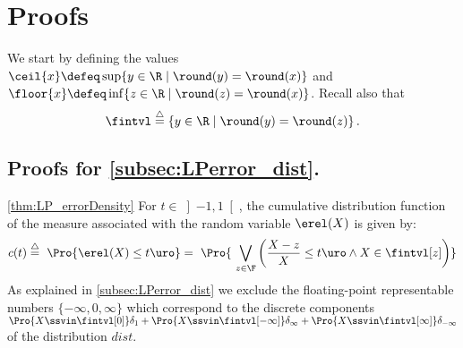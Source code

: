 
\appendix

\section{Proofs}
We start by defining the values $\ceil{x}\defeq \sup\{y\in\R\mid \round(y)=\round(x)\}$ and $\floor{x}\defeq \inf\{z\in\R\mid \round(z)=\round(x)\}$. Recall also that 
\[
\fintvl\stackrel{\triangle}{=}\left\{y\in\R\mid \round(y)=\round(z)\right\}.
\]

\subsection{Proofs for \cref{subsec:LPerror_dist}.}

\begin{myproof}{\cref{thm:LP_errorDensity}}
For $t\in\left]-1,1\right[$, the cumulative distribution function of the measure associated with the random variable $\erel(X)$ is given by:
\begin{align*}
c(t)\stackrel{\triangle}{=}~\Pro{\erel(X)\leq t\uro}=~\Pro{~\bigvee_{z\in\F}\left(\frac{X-z}{X}\leq t\uro\wedge X\in \fintvl[z]\right)}
\end{align*}
As explained in \cref{subsec:LPerror_dist} we exclude the floating-point representable numbers $\{-\infty, 0, \infty\}$ which correspond to the discrete components $\Pro{X\ssvin\fintvl[0]}\delta_1 + \Pro{X\ssvin\fintvl[-\infty]}\delta_{\infty}\ \hspace{-3pt}+ \Pro{X\ssvin\fintvl[\infty]}\delta_{-\infty}$ of the distribution $dist$.


\end{myproof}
